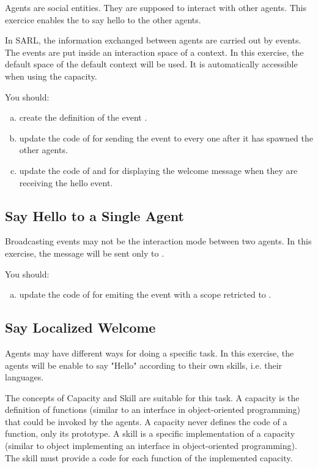 \documentclass[article,english,nodocumentinfo]{multiagentfrreport}
\begin{document}
Agents are social entities. They are supposed to interact with other agents.
This exercice enables the  to say hello to the other agents.

In SARL, the information exchanged between agents are carried out by events.
The events are put inside an interaction space of a context.
In this exercise, the default space of the default context will be used.
It is automatically accessible when using the  capacity.

You should:
\begin{enumerate}[a)]
\item create the definition of the event .
\item update the code of  for sending the event to every one after it has spawned the other agents.
\item update the code of  and  for displaying the welcome message when they are receiving the hello event.
\end{enumerate}

\subsection{Say Hello to a Single Agent}

Broadcasting events may not be the interaction mode between two agents.
In this exercise, the  message will be sent only to .

You should:
\begin{enumerate}[a)]
\item update the code of  for emiting the event with a scope retricted to .
\end{enumerate}

\subsection{Say Localized Welcome}

Agents may have different ways for doing a specific task.
In this exercise, the agents will be enable to say "Hello" according to their own skills, i.e. their languages.

The concepts of Capacity and Skill are suitable for this task.
A capacity is the definition of functions (similar to an interface in object-oriented programming) that could be invoked by the agents. A capacity never defines the code of a function, only its prototype.
A skill is a specific implementation of a capacity (similar to object implementing an interface in object-oriented programming). The skill must provide a code for each function of the implemented capacity.
\end{document}

